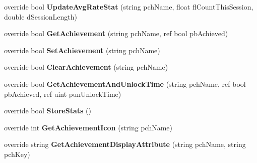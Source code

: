 \begin{DoxyCompactItemize}
override bool {\bfseries Update\+Avg\+Rate\+Stat} (string pch\+Name, float fl\+Count\+This\+Session, double d\+Session\+Length)
\item 
\mbox{\label{class_valve_1_1_steamworks_1_1_c_steam_user_stats_aea76acf926b86d1a2cf1c06a1f7b292f}} 
override bool {\bfseries Get\+Achievement} (string pch\+Name, ref bool pb\+Achieved)
\item 
\mbox{\label{class_valve_1_1_steamworks_1_1_c_steam_user_stats_aade2aa7506ee78dd005a678c4c0c9434}} 
override bool {\bfseries Set\+Achievement} (string pch\+Name)
\item 
\mbox{\label{class_valve_1_1_steamworks_1_1_c_steam_user_stats_a5a86b3e265407512045b3577976a62b2}} 
override bool {\bfseries Clear\+Achievement} (string pch\+Name)
\item 
\mbox{\label{class_valve_1_1_steamworks_1_1_c_steam_user_stats_afb1c33e937e54f92d81202503f209dd0}} 
override bool {\bfseries Get\+Achievement\+And\+Unlock\+Time} (string pch\+Name, ref bool pb\+Achieved, ref uint pun\+Unlock\+Time)
\item 
\mbox{\label{class_valve_1_1_steamworks_1_1_c_steam_user_stats_af580acbcebd317d1d946d73723adf067}} 
override bool {\bfseries Store\+Stats} ()
\item 
\mbox{\label{class_valve_1_1_steamworks_1_1_c_steam_user_stats_a82c09c327983132128728915fb1c72cd}} 
override int {\bfseries Get\+Achievement\+Icon} (string pch\+Name)
\item 
\mbox{\label{class_valve_1_1_steamworks_1_1_c_steam_user_stats_a493c9e8b5b7ce124d2b95083f2cf29fe}} 
override string {\bfseries Get\+Achievement\+Display\+Attribute} (string pch\+Name, string pch\+Key)
\item 
\mbox{\label{class_valve_1_1_steamworks_1_1_c_steam_user_stats_abc14f4c903defb49cab82b2b359cb8ce}} 

\end{DoxyCompactItemize}
